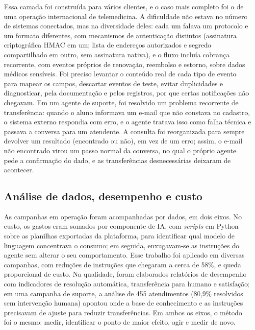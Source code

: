 \documentclass[12pt,a4paper,oneside]{article}
\begin{document}
Essa camada foi construída para vários clientes, e o caso mais completo foi o de uma operação internacional de telemedicina. A dificuldade não estava no número de sistemas conectados, mas na diversidade deles: cada um falava um protocolo e um formato diferentes, com mecanismos de autenticação distintos (assinatura criptográfica HMAC em um; lista de endereços autorizados e segredo compartilhado em outro, sem assinatura nativa), e o fluxo incluía cobrança recorrente, com eventos próprios de renovação, reembolso e estorno, sobre dados médicos sensíveis. Foi preciso levantar o conteúdo real de cada tipo de evento para mapear os campos, descartar eventos de teste, evitar duplicidades e diagnosticar, pela documentação e pelos registros, por que certas notificações não chegavam. Em um agente de suporte, foi resolvido um problema recorrente de transferência: quando o aluno informava um e-mail que não constava no cadastro, o sistema externo respondia com erro, e o agente tratava isso como falha técnica e passava a conversa para um atendente. A consulta foi reorganizada para sempre devolver um resultado (encontrado ou não), em vez de um erro; assim, o e-mail não encontrado virou um passo normal da conversa, no qual o próprio agente pede a confirmação do dado, e as transferências desnecessárias deixaram de acontecer.

\subsection{Análise de dados, desempenho e custo}

As campanhas em operação foram acompanhadas por dados, em dois eixos. No custo, os gastos eram somados por componente de IA, com \textit{scripts} em Python sobre as planilhas exportadas da plataforma, para identificar qual modelo de linguagem concentrava o consumo; em seguida, enxugavam-se as instruções do agente sem alterar o seu comportamento. Esse trabalho foi aplicado em diversas campanhas, com reduções de instruções que chegaram a cerca de 58\%, e queda proporcional de custo. Na qualidade, foram elaborados relatórios de desempenho com indicadores de resolução automática, transferência para humano e satisfação; em uma campanha de suporte, a análise de 455 atendimentos (80,9\% resolvidos sem intervenção humana) apontou onde a base de conhecimento e as instruções precisavam de ajuste para reduzir transferências. Em ambos os eixos, o método foi o mesmo: medir, identificar o ponto de maior efeito, agir e medir de novo.

\end{document}
